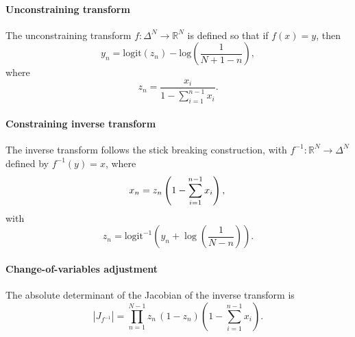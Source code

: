\documentclass[11pt]{article}
\newcommand{\abs}[1]{\left| #1 \right|}
\begin{document}
\paragraph{Unconstraining transform}
The unconstraining transform $f : \Delta^{N} \to  \mathbb{R}^N$ is defined so that if $f(x) = y$, then
\[
y_n
= \mathrm{logit}(z_n)
  - \mbox{log}\left(\frac{1}{N + 1 - n} \right),
\]
where 
\[ 
 z_n = \frac{x_i}{1 - \sum_{i = 1}^{n-1} x_{i}}.
\]

\paragraph{Constraining inverse transform}
The inverse transform follows the stick breaking construction, with $f^{-1} \colon \mathbb{R}^N \to \Delta^N$ defined by $f^{-1}(y) = x$, where
\[
x_n = z_n \left( 1 - \sum_{i=1}^{n-1} x_i \right), \\
\]
with
\[
z_n = \mathrm{logit}^{-1}\!\left(
y_n  + \log \left( \frac{1}{N - n} \right)
\right).
\]
                                            
\paragraph{Change-of-variables adjustment} 
The absolute determinant of the Jacobian of the inverse transform is
\[
\abs{J_{f^{-1}}} 
= \prod_{n=1}^{N-1}
   z_n \, (1 - z_n)
   \left( 1 - \sum_{i=1}^{n-1} x_{i} \right).
\]

\end{document}
